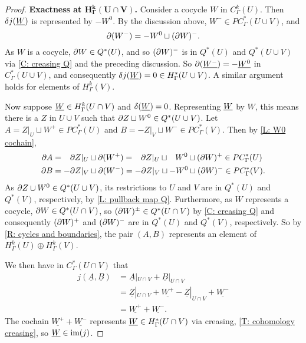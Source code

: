 \begin{proof}
	\textbf{Exactness at $\mathbf{H^k_\Gamma(U \cap V)}$.}
	Consider a cocycle $W$ in $C^k_\Gamma(U)$.
	Then $\delta j(\underline{W})$ is represented by $-W^0$.
	By the discussion above, $W^- \in PC^*_\Gamma(U \cup V)$, and $$\partial (W^-) = -W^0 \sqcup (\partial W)^-.$$ As $W$ is a cocycle, $\partial W \in Q^*(U)$, and so $(\partial W)^-$ is in $Q^*(U)$ and $Q^*(U \cup V)$ via \cref{C: creasing Q} and the preceding discussion.
	So $\partial (\underline{W^-}) = - \underline{W^0}$ in $C^*_\Gamma(U \cup V)$, and consequently
 $\delta j(\underline{W}) = 0 \in H^*_\Gamma(U \cup V)$.
	A similar argument holds for elements of $H^k_\Gamma(V)$.

	Now suppose $\underline{W} \in H^k_\Gamma(U \cap V)$ and $\delta(\underline{W}) = 0$.
	Representing $\underline{W}$ by $W$, this means there is a $Z$ in $U \cup V$ such that $\partial Z \sqcup W^0 \in Q^*(U \cup V)$.
	Let $A = Z|_U \sqcup W^+ \in PC^*_\Gamma(U)$ and $B = -Z|_V \sqcup W^- \in PC^*_\Gamma(V)$.
	Then by \cref{L: W0 cochain},
	\begin{align*}
		\partial A& = \phantom{-}\partial Z|_U \sqcup \partial( W^+) = \phantom{-}\partial Z|_U \sqcup \phantom{-} W^0 \sqcup (\partial W)^{+} \in PC^*_\Gamma(U)\\
		\partial B& = -\partial Z|_V \sqcup \partial (W^-) = -\partial Z|_V \sqcup -W^0 \sqcup (\partial W)^{-} \in PC^*_\Gamma(V).
	\end{align*}
	As $\partial Z \cup W^0 \in Q^*(U \cup V)$, its restrictions to $U$ and $V$ are in $Q^*(U)$ and $Q^*(V)$, respectively, by \cref{L: pullback map Q}.
	Furthermore, as $W$ represents a cocycle, $\partial W \in Q^*(U \cap V)$, so $(\partial W)^\pm \in Q^*(U\cap V)$ by \cref{C: creasing Q} and consequently $(\partial W)^+$ and $(\partial W)^-$ are in $Q^*(U)$ and $Q^*(V)$, respectively.
	So by \cref{R: cycles and boundaries}, the pair $(A,B)$ represents an element of $H^k_\Gamma(U) \oplus H^k_\Gamma(V)$.

	We then have in $C^*_\Gamma(U \cap V)$ that
	\begin{align*}
		j(\underline{A}, \underline{B})& = \underline{A}|_{U \cap V} + \underline{B}|_{U \cap V}\\
		& = \underline{Z}|_{U \cap V}+ \underline{W^+} - \underline{Z}|_{U \cap V} + \underline{W^-}\\
		& = \underline{W^+} + \underline{W^-}.
	\end{align*}
	The cochain $\underline{W^+} + \underline{W^-}$ represents $\underline{W} \in H^*_\Gamma(U \cap V)$ via creasing, \cref{T: cohomology creasing}, so $\underline{W} \in \text{im}(j)$.
\end{proof}

